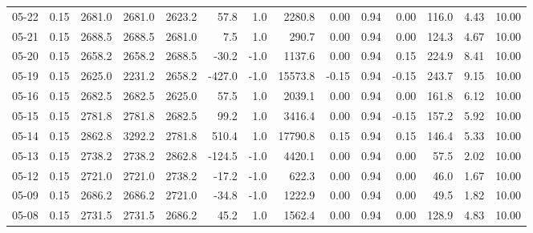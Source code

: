 \begin{threeparttable}
{\begin{tabular}{lrrrrrrrrrrrrr}
  05-22 &     0.15 & 2681.0 & 2681.0 & 2623.2 &       57.8 &                      1.0 &              2280.8 &       0.00 &      0.94 &           0.00 &            116.0 &            4.43 &                  10.00 \\
  05-21 &     0.15 & 2688.5 & 2688.5 & 2681.0 &        7.5 &                      1.0 &               290.7 &       0.00 &      0.94 &           0.00 &            124.3 &            4.67 &                  10.00 \\
  05-20 &     0.15 & 2658.2 & 2658.2 & 2688.5 &      -30.2 &                     -1.0 &              1137.6 &       0.00 &      0.94 &           0.15 &            224.9 &            8.41 &                  10.00 \\
  05-19 &     0.15 & 2625.0 & 2231.2 & 2658.2 &     -427.0 &                     -1.0 &             15573.8 &      -0.15 &      0.94 &          -0.15 &            243.7 &            9.15 &                  10.00 \\
  05-16 &     0.15 & 2682.5 & 2682.5 & 2625.0 &       57.5 &                      1.0 &              2039.1 &       0.00 &      0.94 &           0.00 &            161.8 &            6.12 &                  10.00 \\
  05-15 &     0.15 & 2781.8 & 2781.8 & 2682.5 &       99.2 &                      1.0 &              3416.4 &       0.00 &      0.94 &          -0.15 &            157.2 &            5.92 &                  10.00 \\
  05-14 &     0.15 & 2862.8 & 3292.2 & 2781.8 &      510.4 &                      1.0 &             17790.8 &       0.15 &      0.94 &           0.15 &            146.4 &            5.33 &                  10.00 \\
  05-13 &     0.15 & 2738.2 & 2738.2 & 2862.8 &     -124.5 &                     -1.0 &              4420.1 &       0.00 &      0.94 &           0.00 &             57.5 &            2.02 &                  10.00 \\
  05-12 &     0.15 & 2721.0 & 2721.0 & 2738.2 &      -17.2 &                     -1.0 &               622.3 &       0.00 &      0.94 &           0.00 &             46.0 &            1.67 &                  10.00 \\
  05-09 &     0.15 & 2686.2 & 2686.2 & 2721.0 &      -34.8 &                     -1.0 &              1222.9 &       0.00 &      0.94 &           0.00 &             49.5 &            1.82 &                  10.00 \\
  05-08 &     0.15 & 2731.5 & 2731.5 & 2686.2 &       45.2 &                      1.0 &              1562.4 &       0.00 &      0.94 &           0.00 &            128.9 &            4.83 &                  10.00 \\

\end{tabular}}
\end{threeparttable}
